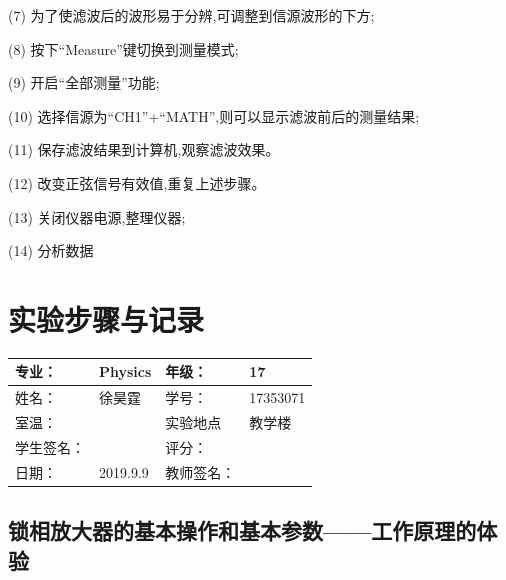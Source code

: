 \documentclass[11pt,a4paper]{ctexart}
\begin{document}
(7) 为了使滤波后的波形易于分辨,可调整到信源波形的下方;

(8) 按下“Measure”键切换到测量模式;

(9) 开启“全部测量”功能;

(10) 选择信源为“CH1”+“MATH”,则可以显示滤波前后的测量结果;

(11) 保存滤波结果到计算机,观察滤波效果。

(12) 改变正弦信号有效值,重复上述步骤。

(13) 关闭仪器电源,整理仪器;

(14) 分析数据

\newpage
\section{实验步骤与记录}
\begin{tabular}{|p{8em}|p{8em}|p{8em}|p{8em}|}
	\hline 
	专业：     &Physics       &年级：      & 17     \\
	\hline
	姓名：& 徐昊霆 &学号：&17353071  \\
	\hline
	室温：&                    &实验地点 & 教学楼 \\
	\hline	
	学生签名： & & 评分： & \\
	\hline
	日期： & 2019.9.9 & 教师签名：&  \\
	\hline
\end{tabular}
	\subsection{锁相放大器的基本操作和基本参数——工作原理的体验}
\end{document}
